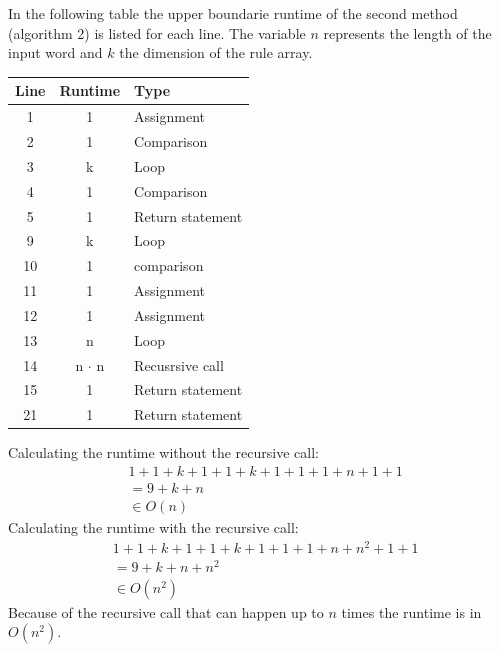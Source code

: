 \documentclass[a4paper, 11pt]{article}
\begin{document}
In the following table the upper boundarie runtime of the second method (algorithm 2) is listed for each line. The variable $n$ represents the length of the input word and $k$ the dimension of the rule array.

\begin{minipage}{0.5\textwidth}

\begin{tabular}{|c|c|l|}
\hline
Line & Runtime & Type \\
\hline
\hline
1 &  1 & Assignment \\
2 &  1 & Comparison \\
3 & k & Loop \\
4 & 1 & Comparison \\
5 & 1 & Return statement\\
9 & k & Loop \\
10 & 1 & comparison \\
11 & 1 & Assignment \\
12 & 1 & Assignment\\
13 & n & Loop \\
14 & n $\cdot$ n & Recusrsive call \\
15 & 1 & Return statement\\
21 & 1 & Return statement \\
\hline
\end{tabular}

\end{minipage}\begin{minipage}{0.5\textwidth}
Calculating the runtime without the recursive call:
\vspace*{-1em}
\begin{align*}
& 1 + 1+ k + 1 +1 +k + 1 + 1 + 1 + n + 1 + 1 \\
& =  9 + k + n  \\
& \in O(n)
\end{align*}
Calculating the runtime with the recursive call:
\vspace*{-1em}
\begin{align*}
& 1 + 1+ k + 1 +1 +k + 1 + 1 + 1 + n + n^2 + 1 + 1 \\
& =  9 + k + n + n^2  \\
& \in O(n^2)
\end{align*}
Because of the recursive call that can happen up to $n$ times the runtime is in $O(n^2)$.
\end{minipage}

\end{document}
